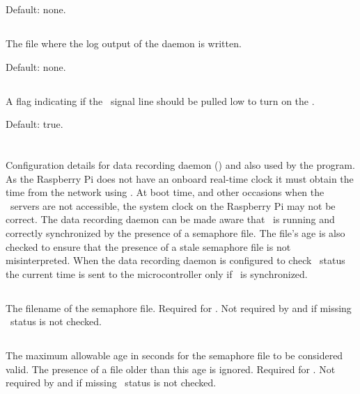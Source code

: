 Default: none.

\subsection{}
The file where the log output of the 
daemon is written.

Default: none.

\subsection{}
A flag indicating if the \dtr\ signal line should be pulled low to
turn on the \led.

Default: true.

\section{}

Configuration details for data recording daemon ()
and also used by the  program. As the
Raspberry Pi does not have an onboard real-time clock it must obtain
the time from the network using \ntp. At boot time, and other
occasions when the \ntp\ servers are not accessible, the system clock
on the Raspberry Pi may not be correct. The data recording daemon can
be made aware that \ntp\ is running and correctly synchronized by the
presence of a semaphore file. The file's age is also checked to ensure
that the presence of a stale semaphore file is not
misinterpreted. When the data recording daemon is configured to check
\ntp\ status the current time is sent to the microcontroller only if
\ntp\ is synchronized.

\subsection{}
The filename of the semaphore file. Required for
. Not required by  and
if missing \ntp\ status is not checked.

\subsection{}
The maximum allowable age in seconds for the semaphore file to be
considered valid. The presence of a file older than this age is
ignored. Required for . Not required by
 and if missing \ntp\ status is not checked.



